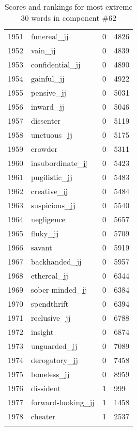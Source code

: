 \begin{longtable}[!htbp]{| rlr@{.}l |}
    1951 & funereal\_jj & 0 & 4826 \\
    1952 & vain\_jj & 0 & 4839 \\
    1953 & confidential\_jj & 0 & 4890 \\
    1954 & gainful\_jj & 0 & 4922 \\
    1955 & pensive\_jj & 0 & 5031 \\
    1956 & inward\_jj & 0 & 5046 \\
    1957 & dissenter & 0 & 5119 \\
    1958 & unctuous\_jj & 0 & 5175 \\
    1959 & crowder & 0 & 5311 \\
    1960 & insubordinate\_jj & 0 & 5423 \\
    1961 & pugilistic\_jj & 0 & 5483 \\
    1962 & creative\_jj & 0 & 5484 \\
    1963 & suspicious\_jj & 0 & 5540 \\
    1964 & negligence & 0 & 5657 \\
    1965 & fluky\_jj & 0 & 5709 \\
    1966 & savant & 0 & 5919 \\
    1967 & backhanded\_jj & 0 & 5957 \\
    1968 & ethereal\_jj & 0 & 6344 \\
    1969 & sober-minded\_jj & 0 & 6384 \\
    1970 & spendthrift & 0 & 6394 \\
    1971 & reclusive\_jj & 0 & 6788 \\
    1972 & insight & 0 & 6874 \\
    1973 & unguarded\_jj & 0 & 7089 \\
    1974 & derogatory\_jj & 0 & 7458 \\
    1975 & boneless\_jj & 0 & 8959 \\
    1976 & dissident & 1 & 999 \\
    1977 & forward-looking\_jj & 1 & 1458 \\
    1978 & cheater & 1 & 2537 \\
    \hline
    \caption{Scores and rankings for most extreme 30 words in component \#62} \\
\end{longtable}
